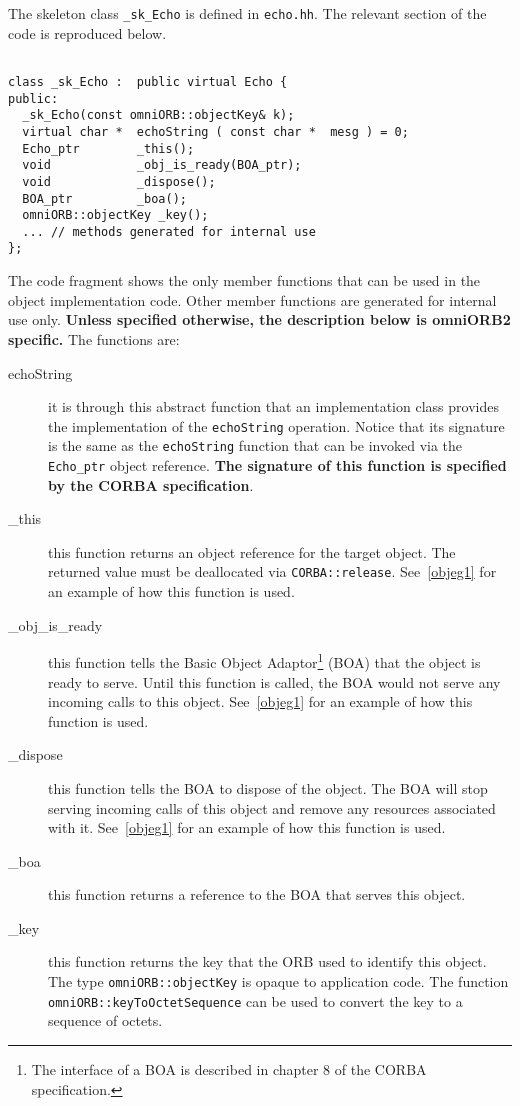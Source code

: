 \documentclass[11pt,twoside,onecolumn]{book}
\begin{document}
The skeleton class {\tt \_sk\_Echo} is defined in {\tt echo.hh}. The
relevant section of the code is reproduced below. 

{\small
\begin{verbatim}

class _sk_Echo :  public virtual Echo {
public:
  _sk_Echo(const omniORB::objectKey& k);
  virtual char *  echoString ( const char *  mesg ) = 0;
  Echo_ptr        _this();
  void            _obj_is_ready(BOA_ptr);
  void            _dispose();
  BOA_ptr         _boa();
  omniORB::objectKey _key();  
  ... // methods generated for internal use
};

\end{verbatim}
}

The code fragment shows the only member functions that can be used in the
object implementation code. Other member functions are generated for
internal use only. {\bf Unless specified otherwise, the description below
is omniORB2 specific.}  The functions are:

\begin{description}

\item[echoString] it is through this abstract function that an
implementation class provides the implementation of the {\tt echoString}
operation. Notice that its signature is the same as the {\tt echoString}
function that can be invoked via the {\tt Echo\_ptr} object reference.
{\bf The signature of this function is specified by the CORBA specification}.

\item[\_this] this function returns an object reference for the target
object. The returned value must be deallocated via {\tt CORBA::release}.
See~\ref{objeg1} for an example of how this function is used.

\item[\_obj\_is\_ready] this function tells the Basic Object
Adaptor\footnote{The interface of a BOA is described in chapter 8 of the
CORBA specification.} (BOA) that the object is ready to serve. Until this
function is called, the BOA would not serve any incoming calls to this
object. See~\ref{objeg1} for an example of how this function is used.

\item[\_dispose] this function tells the BOA to dispose of the object.
The BOA will stop serving incoming calls of this object and remove any
resources associated with it.
See~\ref{objeg1} for an example of how this function is used.

\item[\_boa] this function returns a reference to the BOA that serves this
object.

\item[\_key] this function returns the key that the ORB used to identify
this object. The type {\tt omniORB::objectKey} is opaque to application
code. The function {\tt omniORB::keyToOctetSequence} can be used to
convert the key to a sequence of octets.

\end{description}
\end{document}
